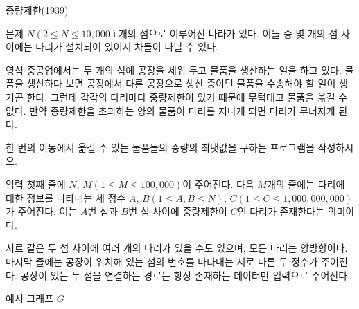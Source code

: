 
\begin{frame}[label=p1]{중량제한(1939)}

\footnotesize

\begin{block}{문제}
$N(2 \le N \le 10{,}000)$개의 섬으로 이루어진 나라가 있다. 이들 중 몇 개의 섬 사이에는 다리가 설치되어 있어서 차들이 다닐 수 있다.

영식 중공업에서는 두 개의 섬에 공장을 세워 두고 물품을 생산하는 일을 하고 있다. 물품을 생산하다 보면 공장에서 다른 공장으로 생산 중이던 물품을 수송해야 할 일이 생기곤 한다. 그런데 각각의 다리마다 중량제한이 있기 때문에 무턱대고 물품을 옮길 수 없다. 만약 중량제한을 초과하는 양의 물품이 다리를 지나게 되면 다리가 무너지게 된다.

한 번의 이동에서 옮길 수 있는 물품들의 중량의 최댓값을 구하는 프로그램을 작성하시오.
\end{block}

\begin{block}{입력}
첫째 줄에 $N$, $M(1 \le M \le 100{,}000)$이 주어진다. 다음 $M$개의 줄에는 다리에 대한 정보를 나타내는 세 정수 $A$, $B(1 \le A, B \le N)$, $C(1 \le C \le 1{,}000{,}000{,}000)$가 주어진다. 이는 $A$번 섬과 $B$번 섬 사이에 중량제한이 $C$인 다리가 존재한다는 의미이다.

서로 같은 두 섬 사이에 여러 개의 다리가 있을 수도 있으며, 모든 다리는 양방향이다. 마지막 줄에는 공장이 위치해 있는 섬의 번호를 나타내는 서로 다른 두 정수가 주어진다. 공장이 있는 두 섬을 연결하는 경로는 항상 존재하는 데이터만 입력으로 주어진다.
\end{block}

\end{frame}

\begin{frame}{예시 그래프 $G$}

\footnotesize

\begin{center}
\end{center}

\end{frame}

